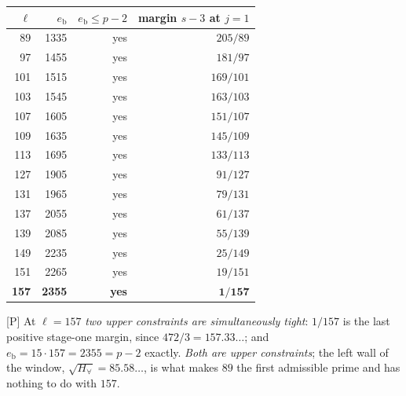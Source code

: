 \documentclass[11pt]{article}
\theoremstyle{plain}
\theoremstyle{definition}
\begin{document}
\begin{center}
\begin{tabular}{rrrr}
\toprule
$\ell$ & $e_{\mathrm b}$ & $e_{\mathrm b}\le p-2$ & margin $s-3$ at $j=1$\\
\midrule
 89 & 1335 & yes & $205/89$\\
 97 & 1455 & yes & $181/97$\\
101 & 1515 & yes & $169/101$\\
103 & 1545 & yes & $163/103$\\
107 & 1605 & yes & $151/107$\\
109 & 1635 & yes & $145/109$\\
113 & 1695 & yes & $133/113$\\
127 & 1905 & yes & $91/127$\\
131 & 1965 & yes & $79/131$\\
137 & 2055 & yes & $61/137$\\
139 & 2085 & yes & $55/139$\\
149 & 2235 & yes & $25/149$\\
151 & 2265 & yes & $19/151$\\
\textbf{157} & \textbf{2355} & \textbf{yes} & $\mathbf{1/157}$\\
\bottomrule
\end{tabular}
\end{center}

\textup{[P]} At $\ell=157$ \emph{two upper constraints are simultaneously tight}:
$1/157$ is the last positive stage-one margin, since $472/3=157.33\ldots$; and
$e_{\mathrm b}=15\cdot157=2355=p-2$ exactly.  \emph{Both are upper constraints}; the
left wall of the window, $\sqrt{H_\forall}=85.58\ldots$, is what makes $89$ the first admissible
prime and has nothing to do with $157$.
\end{document}
